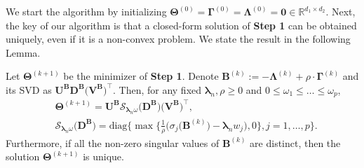 \documentclass[alpha-refs]{wiley-article}
\begin{document}
We start the algorithm by initializing  $\boldsymbol{\Theta}^{(0)}=\boldsymbol{\Gamma}^{(0)}=\boldsymbol{\Lambda}^{(0)}=\boldsymbol{0} \in\mathbb{R}^{d_{1}\times d_{2}}$.
Next, the key of our algorithm is that a closed-form solution of \textbf{Step 1} can be obtained uniquely, even if it is a non-convex problem. 
We state the result in the following Lemma.
\begin{lemma} \label{Lemma2.1}
    Let $\boldsymbol{\Theta}^{(k+1)}$ be the minimizer of \textbf{Step 1}.
    Denote $\boldsymbol{B}^{(k)}:=-\boldsymbol{\Lambda}^{(k)}+\rho \cdot \boldsymbol{\Gamma}^{(k)}$ and its SVD as $\boldsymbol{U}^{\textbf{B}}\boldsymbol{D}^{\textbf{B}}\big(\boldsymbol{V}^{\textbf{B}}\big)^{\top}$.
    Then, for any fixed $\boldsymbol{\lambda}_{n}, \rho \geq 0 $ and $0\leq \omega_{1} \leq \dots \leq \omega_{p}$, 
    \begin{align*}
        &\boldsymbol{\Theta}^{(k+1)} = \boldsymbol{U}^{\textbf{B}}\mathcal{S}_{\boldsymbol{\lambda}_{n}\omega}\big(\boldsymbol{D}^{\textbf{B}}\big)\big(\boldsymbol{V}^{\textbf{B}}\big)^{\top}, \\ 
        &\mathcal{S}_{\boldsymbol{\lambda}_{n}\omega}\big(\boldsymbol{D}^{\textbf{B}}\big) = \text{diag}\bigg\{ \max\bigg\{\frac{1}{\rho}\big(\sigma_{j}(\boldsymbol{B}^{(k)}\big)-\boldsymbol{\lambda}_{n} w_{j}\big),0 \bigg\},  j=1,\dots,p \bigg\}.
    \end{align*}
    Furthermore, if all the non-zero singular values of $\boldsymbol{B}^{(k)}$ are distinct, then the solution $\boldsymbol{\Theta}^{(k+1)}$ is unique.
\end{lemma}
\end{document}
